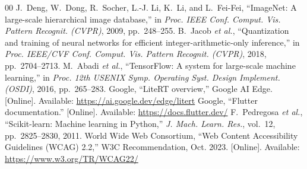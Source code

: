 \documentclass[conference,a4paper]{IEEEtran}
\begin{document}
\begin{thebibliography}{00}
 J.~Deng, W.~Dong, R.~Socher, L.-J. Li, K.~Li, and L.~Fei-Fei, ``ImageNet: A large-scale hierarchical image database,'' in \emph{Proc. IEEE Conf. Comput. Vis. Pattern Recognit. (CVPR)}, 2009, pp.~248--255.
 B.~Jacob \emph{et al.}, ``Quantization and training of neural networks for efficient integer-arithmetic-only inference,'' in \emph{Proc. IEEE/CVF Conf. Comput. Vis. Pattern Recognit. (CVPR)}, 2018, pp.~2704--2713.
 M.~Abadi \emph{et al.}, ``TensorFlow: A system for large-scale machine learning,'' in \emph{Proc. 12th USENIX Symp. Operating Syst. Design Implement. (OSDI)}, 2016, pp.~265--283.
 Google, ``LiteRT overview,'' Google AI Edge. [Online]. Available: \url{https://ai.google.dev/edge/litert}
 Google, ``Flutter documentation.'' [Online]. Available: \url{https://docs.flutter.dev/}
 F.~Pedregosa \emph{et al.}, ``Scikit-learn: Machine learning in Python,'' \emph{J. Mach. Learn. Res.}, vol.~12, pp.~2825--2830, 2011.
 World Wide Web Consortium, ``Web Content Accessibility Guidelines (WCAG) 2.2,'' W3C Recommendation, Oct. 2023. [Online]. Available: \url{https://www.w3.org/TR/WCAG22/}
\end{thebibliography}
\end{document}
